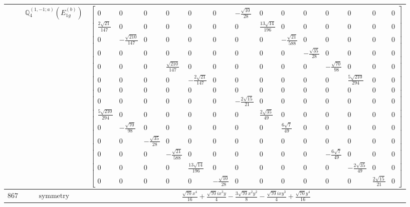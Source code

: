 \documentclass[fleqn,8pt,landscape]{jsarticle}
\begin{document}
\begin{longtable}{ccc}
$  $ & $ \mathbb{Q}_{4}^{(1,-1;a)}(E_{1g}^{(b)}) $ & $ \begin{bmatrix} 0 & 0 & 0 & 0 & 0 & 0 & - \frac{\sqrt{10}}{28} & 0 & 0 & 0 & 0 & 0 & 0 & 0 \\ \frac{2 \sqrt{21}}{147} & 0 & 0 & 0 & 0 & 0 & 0 & \frac{13 \sqrt{14}}{196} & 0 & 0 & 0 & 0 & 0 & 0 \\ 0 & - \frac{\sqrt{210}}{147} & 0 & 0 & 0 & 0 & 0 & 0 & - \frac{\sqrt{21}}{588} & 0 & 0 & 0 & 0 & 0 \\ 0 & 0 & 0 & 0 & 0 & 0 & 0 & 0 & 0 & - \frac{\sqrt{35}}{28} & 0 & 0 & 0 & 0 \\ 0 & 0 & 0 & \frac{\sqrt{210}}{147} & 0 & 0 & 0 & 0 & 0 & 0 & - \frac{\sqrt{70}}{98} & 0 & 0 & 0 \\ 0 & 0 & 0 & 0 & - \frac{2 \sqrt{21}}{147} & 0 & 0 & 0 & 0 & 0 & 0 & \frac{5 \sqrt{210}}{294} & 0 & 0 \\ 0 & 0 & 0 & 0 & 0 & 0 & 0 & 0 & 0 & 0 & 0 & 0 & 0 & 0 \\ 0 & 0 & 0 & 0 & 0 & 0 & - \frac{2 \sqrt{15}}{21} & 0 & 0 & 0 & 0 & 0 & 0 & 0 \\ \frac{5 \sqrt{210}}{294} & 0 & 0 & 0 & 0 & 0 & 0 & \frac{2 \sqrt{35}}{49} & 0 & 0 & 0 & 0 & 0 & 0 \\ 0 & - \frac{\sqrt{70}}{98} & 0 & 0 & 0 & 0 & 0 & 0 & \frac{6 \sqrt{7}}{49} & 0 & 0 & 0 & 0 & 0 \\ 0 & 0 & - \frac{\sqrt{35}}{28} & 0 & 0 & 0 & 0 & 0 & 0 & 0 & 0 & 0 & 0 & 0 \\ 0 & 0 & 0 & - \frac{\sqrt{21}}{588} & 0 & 0 & 0 & 0 & 0 & 0 & - \frac{6 \sqrt{7}}{49} & 0 & 0 & 0 \\ 0 & 0 & 0 & 0 & \frac{13 \sqrt{14}}{196} & 0 & 0 & 0 & 0 & 0 & 0 & - \frac{2 \sqrt{35}}{49} & 0 & 0 \\ 0 & 0 & 0 & 0 & 0 & - \frac{\sqrt{10}}{28} & 0 & 0 & 0 & 0 & 0 & 0 & \frac{2 \sqrt{15}}{21} & 0 \end{bmatrix} $ \\ \hline
$ 867 $ & $ \text{symmetry} $ & $ \frac{\sqrt{70} x^{4}}{16} + \frac{\sqrt{70} i x^{3} y}{4} - \frac{3 \sqrt{70} x^{2} y^{2}}{8} - \frac{\sqrt{70} i x y^{3}}{4} + \frac{\sqrt{70} y^{4}}{16} $ \\

\end{longtable}
\end{document}
